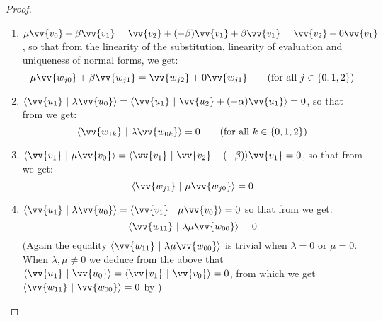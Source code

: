 \documentclass[runningheads,orivec,envcountsame,envcountsect]{llncs}
\def\scal#1#2{\langle{#1}~|~{#2}\rangle}
\begin{document}
\begin{lemma}
\begin{proof}
\begin{enumerate}
        \item\label{A9:it2} $\mu\vv{v_0} + \beta\vv{v_1}=\vv{v_2} + (-\beta) \vv{v_1} + \beta \vv{v_1} = \vv{v_2} + 0 \vv{v_1}$, so that from the linearity of the substitution, linearity of evaluation and uniqueness of normal forms, we get:
        \[
        \mu\vv{w_{j0}} + \beta \vv{w_{j1}} = \vv{w_{j2}} + 0 \vv{w_{j1}} \qquad(\text{for all }j\in\{0,1,2\})
        \]
        
        \item\label{A9:it3} $\scal{\vv{u_1}}{\lambda\vv{u_0}}=\scal{\vv{u_1}}{\vv{u_2}+(- \alpha)\vv{u_1}}=0$, so that from  we get:
        \[
        \scal{\vv{w_{1k}}}{\lambda\vv{w_{0k}}}= 0 \qquad(\text{for all }k\in\{0,1,2\})
        \]
        
        \item\label{A9:it4} $\scal{\vv{v_1}}{\mu\vv{v_0}}=\scal{\vv{v_1}}{\vv{v_2} + (-\beta)}\vv{v_1}=0$, so that from  we get:
        \[
        \scal{\vv{w_{j1}}}{\mu\vv{w_{j0}}}=0
        \]
                
        \item\label{A9:it5} $\scal{\vv{u_1}}{\lambda\vv{u_0}}=\scal{\vv{v_1}}{\mu\vv{v_0}}=0$ so that from  we get:
        \[
        \scal{\vv{w_{11}}}{\lambda\mu\vv{w_{00}}}=0
        \]
        (Again the equality $\scal{\vv{w_{11}}}{\lambda\mu\vv{w_{00}}}$ is trivial when $\lambda=0$ or $\mu=0$. When $\lambda ,\mu\neq 0$ we deduce from the above that $\scal{\vv{u_1}}{\vv{u_0}}=\scal{\vv{v_1}}{\vv{v_0}}=0$, from which we get $\scal{\vv{w_{11}}}{\vv{w_{00}}}=0$ by )
    \end{enumerate}


\end{proof}
\end{lemma}
\end{document}
